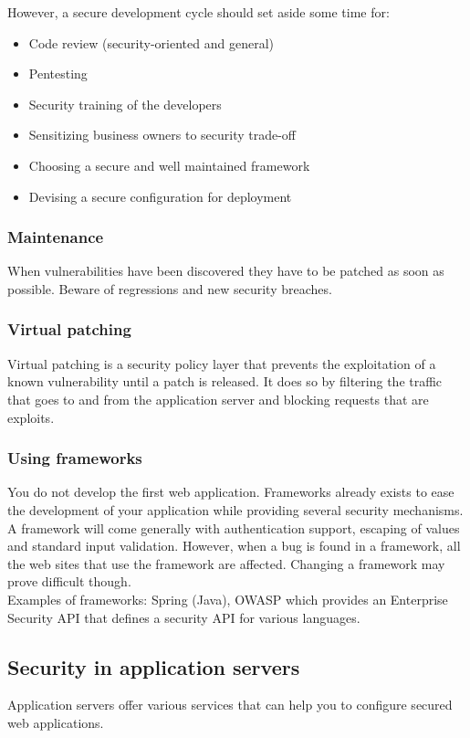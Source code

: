 However, a secure development cycle should set aside some time for:
\begin{itemize}
\item Code review (security-oriented and general)
\item Pentesting
\item Security training of the developers 
\item Sensitizing business owners to security trade-off
\item Choosing a secure and well maintained framework
\item Devising a secure configuration for deployment 
\end{itemize}

\subsubsection{Maintenance}
When vulnerabilities have been discovered they have to be patched as soon as
possible. Beware of regressions and new security breaches.

\subsubsection*{Virtual patching}
Virtual patching is a security policy layer that prevents the exploitation of a known vulnerability until a patch is released.
It does so by filtering the traffic that goes to and from the application server and blocking requests that are exploits.

\subsubsection{Using frameworks}
You do not develop the first web application. Frameworks already exists to
ease the development of your application while providing several security
mechanisms.
A framework will come generally with authentication support, escaping of values and standard input validation.
However, when a bug is found in a framework, all the web sites that use the
framework are affected. Changing a framework may prove difficult though.\\

Examples of frameworks: Spring (Java), OWASP which provides an Enterprise Security API that defines a security API for various languages.

\subsection{Security in application servers}
Application servers offer various services that can help you to configure
secured web applications.

